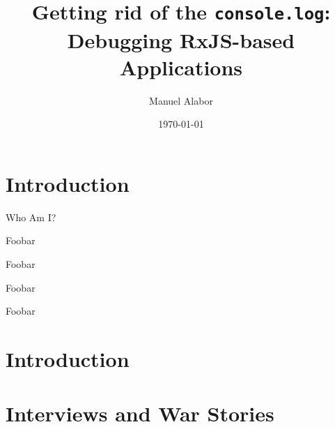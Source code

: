 \documentclass[aspectratio=169]{beamer}
\title[Debugging RxJS-based Applications]{Getting rid of the \texttt{console.log}:\\Debugging RxJS-based Applications}
\author{Manuel Alabor}
\institute{Eastern Switzerland University of Applied Sciences}
\date{\today}
\begin{document}
\maketitle



\section*{Introduction}

\begin{frame}{Who Am I?}
	\begin{vfilleditems}
		\item Foobar\bigskip
		\item Foobar\bigskip
		\item Foobar\bigskip
		\item Foobar\bigskip
	\end{vfilleditems}
\end{frame}


\note[itemize] {
	\item
}

\section*{Introduction}

\begin{frame}{}

\end{frame}

\note[itemize] {
	\item
}


\begin{frame}{}

\end{frame}

\note[itemize] {
	\item
}

\section{Interviews and War Stories}
\end{document}
